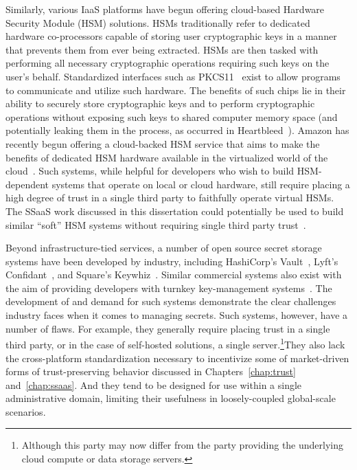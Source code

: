 Similarly, various IaaS platforms have begun offering cloud-based
Hardware Security Module (HSM) solutions. HSMs traditionally refer to
dedicated hardware co-processors capable of storing user cryptographic
keys in a manner that prevents them from ever being extracted. HSMs
are then tasked with performing all necessary cryptographic operations
requiring such keys on the user's behalf. Standardized interfaces such
as PKCS11~\cite{pcks11-standard} exist to allow programs to
communicate and utilize such hardware. The benefits of such chips lie
in their ability to securely store cryptographic keys and to perform
cryptographic operations without exposing such keys to shared computer
memory space (and potentially leaking them in the process, as occurred
in Heartbleed~\cite{heartbleed}). Amazon has recently begun offering a
cloud-backed HSM service that aims to make the benefits of dedicated
HSM hardware available in the virtualized world of the
cloud~\cite{amazon-hsm}. Such systems, while helpful for developers
who wish to build HSM-dependent systems that operate on local or cloud
hardware, still require placing a high degree of trust in a single
third party to faithfully operate virtual HSMs. The SSaaS work
discussed in this dissertation could potentially be used to build
similar ``soft'' HSM systems without requiring single third party
trust~\cite{lorier-pkcs11}.

Beyond infrastructure-tied services, a number of open source secret
storage systems have been developed by industry, including HashiCorp's
Vault~\cite{vault}, Lyft's Confidant~\cite{confidant}, and Square's
Keywhiz~\cite{keywhiz}. Similar commercial systems also exist with the
aim of providing developers with turnkey key-management
systems~\cite{gazzang, porticor, rosen2012}. The development of and
demand for such systems demonstrate the clear challenges industry
faces when it comes to managing secrets. Such systems, however, have a
number of flaws. For example, they generally require placing trust in
a single third party, or in the case of self-hosted solutions, a
single server.\footnote{Although this party may now differ from the
  party providing the underlying cloud compute or data storage
  servers.}They also lack the cross-platform standardization necessary
to incentivize some of market-driven forms of trust-preserving
behavior discussed in Chapters~\ref{chap:trust}
and~\ref{chap:ssaas}. And they tend to be designed for use within a
single administrative domain, limiting their usefulness in
loosely-coupled global-scale scenarios.

